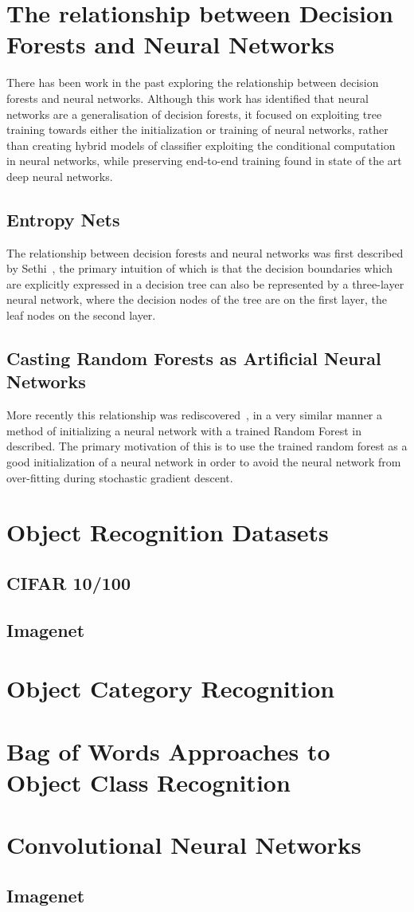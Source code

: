 \documentclass[thesis]{subfiles}
\begin{document}
\section{The relationship between Decision Forests and Neural Networks}
There has been work in the past exploring the relationship between decision forests and neural networks. Although this work has identified that neural networks are a generalisation of decision forests, it focused on exploiting tree training towards either the initialization or training of neural networks, rather than creating hybrid models of classifier exploiting the conditional computation in neural networks, while preserving end-to-end training found in state of the art deep neural networks.


\subsection{Entropy Nets}
The relationship between decision forests and neural networks was first described by Sethi~\cite{Sethi1990}, the primary intuition of which is that the decision boundaries which are explicitly expressed in a decision tree can also be represented by a three-layer neural network, where the decision nodes of the tree are on the first layer, the leaf nodes on the second layer.

\subsection{Casting Random Forests as Artificial Neural Networks}
More recently this relationship was rediscovered~\cite{Welbl2014casting}, in a very similar manner a method of initializing a neural network with a trained Random Forest in described. The primary motivation of this is to use the trained random forest as a good initialization of a neural network in order to avoid the neural network from over-fitting during stochastic gradient descent.

\section{Object Recognition Datasets}
\subsection{CIFAR 10/100}
\subsection{Imagenet}

\section{Object Category Recognition}
\section[Bag of Words]{Bag of Words Approaches to Object Class Recognition}

\section{Convolutional Neural Networks}
\subsection{Imagenet}
\end{document}
